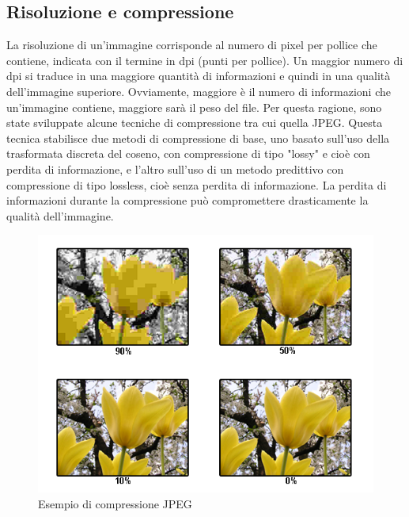 \documentclass[a4paper,11pt]{article}
\begin{document}
    \subsection{Risoluzione e compressione}
    La risoluzione di un'immagine corrisponde al numero di pixel per pollice che contiene, indicata con il termine in dpi (punti per pollice). 
    Un maggior numero di dpi si traduce in una maggiore quantità di informazioni e quindi in una qualità dell'immagine superiore. 
    Ovviamente, maggiore è il numero di informazioni che un'immagine contiene, maggiore sarà il peso del file. 
    Per questa ragione, sono state sviluppate alcune tecniche di compressione tra cui quella JPEG. Questa tecnica stabilisce due metodi di compressione di base,
    uno basato sull'uso della trasformata discreta del coseno, con compressione di tipo "lossy" e cioè con perdita di informazione, e l'altro sull'uso di un metodo predittivo
    con compressione di tipo lossless, cioè senza perdita di informazione. La perdita di informazioni durante la compressione può compromettere drasticamente la qualità dell'immagine.
    \begin{figure}[h]
        \centering
        \includegraphics[scale=0.7]{jpeg.png}
        \caption{Esempio di compressione JPEG}
    \end{figure}
    \newpage
\end{document}
